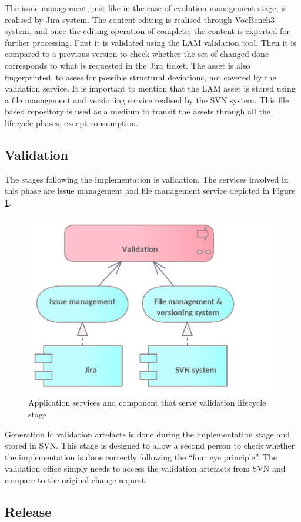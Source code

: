 	The issue management, just like in the case of evolution management stage, is realised by Jira system. The content editing is realised through VocBench3 system, and once the editing operation of complete, the content is exported for further processing. First it is validated using the LAM validation tool. Then it is compared to a previous version to check whether the set of changed done corresponds to what is requested in the Jira ticket. The asset is also fingerprinted, to asses for possible structural deviations, not covered by the validation service. It is important to mention that the LAM asset is stored using a file management and versioning service realised by the SVN system. This file based repository is used as a medium to transit the assets through all the lifecycle phases, except consumption. 

	\subsection{Validation}
	
	The stages following the implementation is validation. The services involved in this phase are issue management and file management service depicted in Figure \ref{fig:app-validation}.
		
	 \begin{figure}[!h]
		\centering
		\includegraphics[width=.5\textwidth]{images/application/lifecycle/Validation.png}
		\caption{Application services and component that serve validation lifecycle stage}
		\label{fig:app-validation}
	\end{figure}	
	
	Generation fo validation artefacts is done during the implementation stage and stored in SVN. This stage is designed to allow a second person to check whether the implementation is done correctly following the ``four eye principle''. The validation office simply needs to access the validation artefacts from SVN and compare to the original change request. 
	
	\subsection{Release}
	\label{sec:release}
	
